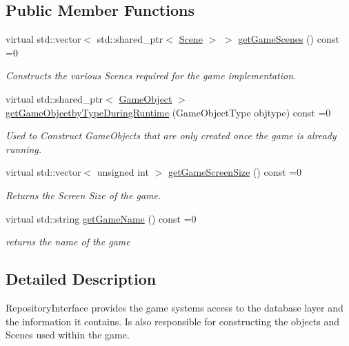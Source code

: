 \subsection*{Public Member Functions}
\begin{DoxyCompactItemize}
\item 
virtual std\+::vector$<$ std\+::shared\+\_\+ptr$<$ \hyperlink{class_scene}{Scene} $>$ $>$ \hyperlink{class_repositiory_interface_a29a0f0fadd317082cb504bbb1161d50d}{get\+Game\+Scenes} () const =0
\begin{DoxyCompactList}\small\item\em Constructs the various Scenes required for the game implementation. \end{DoxyCompactList}\item 
virtual std\+::shared\+\_\+ptr$<$ \hyperlink{class_game_object}{Game\+Object} $>$ \hyperlink{class_repositiory_interface_a7341b8009f262949e26759327b0a8ae4}{get\+Game\+Objectby\+Type\+During\+Runtime} (Game\+Object\+Type objtype) const =0
\begin{DoxyCompactList}\small\item\em Used to Construct Game\+Objects that are only created once the game is already running. \end{DoxyCompactList}\item 
virtual std\+::vector$<$ unsigned int $>$ \hyperlink{class_repositiory_interface_a428e935faa2fd5790cbccc09f1066ef6}{get\+Game\+Screen\+Size} () const =0
\begin{DoxyCompactList}\small\item\em Returns the Screen Size of the game. \end{DoxyCompactList}\item 
virtual std\+::string \hyperlink{class_repositiory_interface_aa40617b92b721ec087dd69f3986e9efd}{get\+Game\+Name} () const =0
\begin{DoxyCompactList}\small\item\em returns the name of the game \end{DoxyCompactList}\end{DoxyCompactItemize}


\subsection{Detailed Description}
Repository\+Interface provides the game systems access to the database layer and the information it contains. Is also responsible for constructing the objects and Scenes used within the game. 

